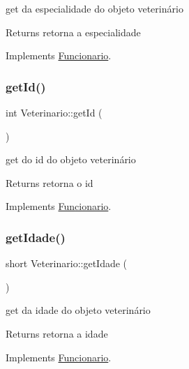 get da especialidade do objeto veterinário 

\begin{DoxyReturn}{Returns}
retorna a especialidade 
\end{DoxyReturn}


Implements \mbox{\hyperlink{class_funcionario}{Funcionario}}.

\mbox{\label{class_veterinario_a05a384c00f24f3631150e7499834eeef}} 
\subsubsection{\texorpdfstring{getId()}{getId()}}
{\footnotesize\ttfamily int Veterinario\+::get\+Id (\begin{DoxyParamCaption}{ }\end{DoxyParamCaption})\hspace{0.3cm}{\ttfamily [virtual]}}



get do id do objeto veterinário 

\begin{DoxyReturn}{Returns}
retorna o id 
\end{DoxyReturn}


Implements \mbox{\hyperlink{class_funcionario}{Funcionario}}.

\mbox{\label{class_veterinario_a672249669ce0b988c2ac827d28a73fb8}} 
\subsubsection{\texorpdfstring{getIdade()}{getIdade()}}
{\footnotesize\ttfamily short Veterinario\+::get\+Idade (\begin{DoxyParamCaption}{ }\end{DoxyParamCaption})\hspace{0.3cm}{\ttfamily [virtual]}}



get da idade do objeto veterinário 

\begin{DoxyReturn}{Returns}
retorna a idade 
\end{DoxyReturn}


Implements \mbox{\hyperlink{class_funcionario}{Funcionario}}.

